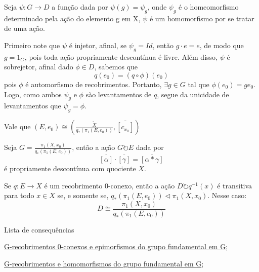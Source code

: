 \begin{dem}
    Seja $\psi:G \longrightarrow D$ a função dada por $\psi(g) = \psi_g$, onde $\psi_g$ é o homeomorfismo determinado pela ação do elemento g em X, $\psi$ é um homomorfismo por se tratar de uma ação.

    Primeiro note que $\psi$ é injetor, afinal, se $\psi_g = Id$, então $g \cdot e = e$, de modo que $g = 1_G$, pois toda ação propriamente descontínua é livre. Além disso, $\psi$ é sobrejetor, afinal dado $\phi \in D$, sabemos que $$q(e_0) = (q \circ \phi)(e_0)$$ pois $\phi$ é automorfismo de recobrimentos. Portanto, $\exists g \in G$ tal que $\phi(e_0) = ge_0$. Logo, como ambos $\psi_g$ e $\phi$ sào levantamentos de $q$, segue da unicidade de levantamentos que $\psi_g = \phi$.
\end{dem}

\begin{af}
    Vale que $(E, e_0) \cong (\frac{\tilde X}{q_*(\pi_1(E, e_0))}, \overline{[c_{x_0}]})$
\end{af}

\begin{af}
    Seja $G = \frac{\pi_1(X, x_0)}{q_*(\pi_1(E, e_0))}$, então a ação $G \circlearrowright E$ dada por $$\overline{[\alpha]} \cdot \overline{[\gamma]} = \overline{[\alpha * \gamma]}$$ é propriamente descontínua com quociente $X$.
\end{af}

\begin{thm}
	Se $q:E \longrightarrow X$ é um recobrimento $0$-conexo, então a ação $D \circlearrowright q^{-1}(x)$ é transitiva para todo $x \in X$ se, e somente se, $q_*(\pi_1(E, e_0)) \triangleleft \pi_1(X, x_0)$. Nesse caso: $$D \cong \frac{\pi_1(X, x_0)}{q_*(\pi_1(E, e_0))}$$
\end{thm}

\begin{titlemize}{Lista de consequências}
	\item \hyperref[g-recobrimentos-e-epimorfismos-prop]{G-recobrimentos 0-conexos e epimorfismos do grupo fundamental em G};\\
    	\item \hyperref[homomorfismos-e-g-recobrimentos-prop]{G-recobrimentos e homomorfismos do grupo fundamental em G};
\end{titlemize}
